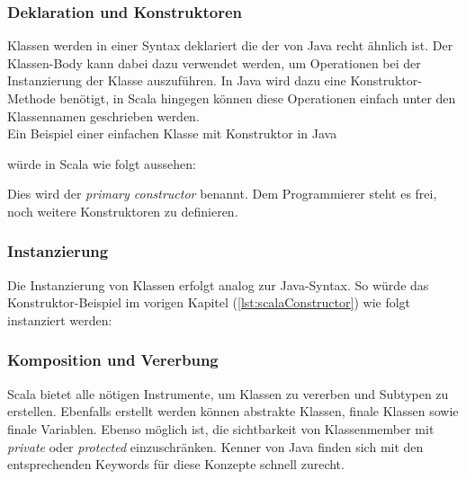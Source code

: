 \subsubsection{Deklaration und Konstruktoren}

Klassen werden in einer Syntax deklariert die der von Java recht
ähnlich ist. Der Klassen-Body kann dabei dazu verwendet werden,
um Operationen bei der Instanzierung der Klasse auszuführen. In Java
wird dazu eine Konstruktor-Methode benötigt, in Scala hingegen können
diese Operationen einfach unter den Klassennamen geschrieben werden. \\

Ein Beispiel einer einfachen Klasse mit Konstruktor in Java


würde in Scala wie folgt aussehen:


Dies wird der \emph{primary constructor} benannt. Dem Programmierer steht es 
frei, noch weitere Konstruktoren zu definieren.


\subsubsection{Instanzierung}

Die Instanzierung von Klassen erfolgt analog zur Java-Syntax. So würde das 
Konstruktor-Beispiel im vorigen Kapitel (\ref{lst:scalaConstructor}) wie 
folgt instanziert werden:



\subsubsection{Komposition und Vererbung}

Scala bietet alle nötigen Instrumente, um Klassen zu vererben und Subtypen
zu erstellen. Ebenfalls erstellt werden können abstrakte Klassen, finale
Klassen sowie finale Variablen. Ebenso möglich ist, die sichtbarkeit von 
Klassenmember mit \emph{private} oder \emph{protected} einzuschränken. 
Kenner von Java finden sich mit den entsprechenden Keywords für diese
Konzepte schnell zurecht.\\

